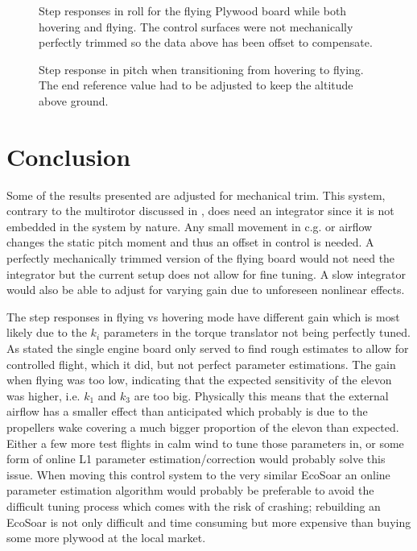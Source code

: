 \documentclass{article}
\begin{document}
\begin{figure}[]
    
    \caption{Step responses in roll for the flying Plywood board while both hovering and flying. The control surfaces were not mechanically perfectly trimmed so the data above has been offset to compensate.}
    \label{fig:rollstep}
\end{figure}

\begin{figure}[]
    
    \caption{Step response in pitch when transitioning from hovering to flying. The end reference value had to be adjusted to keep the altitude above ground.}
    \label{fig:transition}
\end{figure}



\section{Conclusion}

Some of the results presented are adjusted for mechanical trim.
This system, contrary to the multirotor discussed in \cite{P2}, does need an integrator since it is not embedded in the system by nature.
Any small movement in c.g. or airflow changes the static pitch moment and thus an offset in control is needed.
A perfectly mechanically trimmed version of the flying board would not need the integrator but the current setup does not allow for fine tuning.
A slow integrator would also be able to adjust for varying gain due to unforeseen nonlinear effects.

The step responses in flying vs hovering mode have different gain which is most likely due to the $k_i$ parameters in the torque translator not being perfectly tuned.
As stated the single engine board only served to find rough estimates to allow for controlled flight, which it did, but not perfect parameter estimations.
The gain when flying was too low, indicating that the expected sensitivity of the elevon was higher, i.e. $k_1$ and $k_3$ are too big.
Physically this means that the external airflow has a smaller effect than anticipated which probably is due to the propellers wake covering a much bigger proportion of the elevon than expected.
Either a few more test flights in calm wind to tune those parameters in, or some form of online L1 parameter estimation/correction would probably solve this issue.
When moving this control system to the very similar EcoSoar an online parameter estimation algorithm would probably be preferable to avoid the difficult tuning process which comes with the risk of crashing; rebuilding an EcoSoar is not only difficult and time consuming but more expensive than buying some more plywood at the local market.
\end{document}
